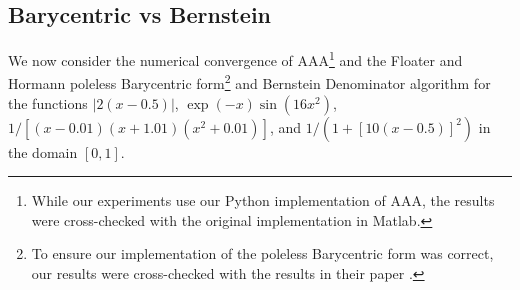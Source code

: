 \documentclass{article}
\begin{document}

{
\subsection{Barycentric vs Bernstein}
We now consider the numerical convergence of AAA\footnote{While our experiments use our Python implementation of AAA, the results were cross-checked with the original implementation in Matlab.} and the Floater and Hormann poleless Barycentric form\footnote{To ensure our implementation of the poleless Barycentric form was correct, our results were cross-checked with the results in their paper \cite{barycentric_poleless}.} and Bernstein Denominator algorithm for the functions $|2(x - 0.5)|$, $\exp(-x)\sin(16x^2)$, $1/[(x-0.01)(x+1.01)(x^2+0.01)]$, and $1/(1 + [10(x - 0.5)]^2)$ in the domain $[0, 1]$. }
\end{document}
